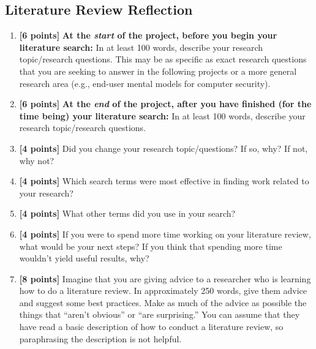 \documentclass{article}
\begin{document}
\subsection{Literature Review Reflection}
\begin{enumerate}
    \item \textbf{[6 points]} \textbf{At the \textit{start} of the project, before you begin your literature search:} In at least 100 words, describe your research topic/research questions. This may be as specific as exact research questions that you are seeking to answer in the following projects or a more general research area (e.g., end-user mental models for computer security).
    \item \textbf{[6 points]} \textbf{At the \textit{end} of the project, after you have finished (for the time being) your literature search:} In at least 100 words, describe your research topic/research questions. 
    \item \textbf{[4 points]} Did you change your research topic/questions? If so, why? If not, why not?
    \item \textbf{[4 points]} Which search terms were most effective in finding work related to your research?
    \item \textbf{[4 points]} What other terms did you use in your search?
    \item \textbf{[4 points]} If you were to spend more time working on your literature review, what would be your next steps? If you think that spending more time wouldn't yield useful results, why?
    \item \textbf{[8 points]} Imagine that you are giving advice to a researcher who is learning how to do a literature review. In approximately 250 words, give them advice and suggest some best practices. Make as much of the advice as possible the things that ``aren't obvious'' or ``are surprising.'' You can assume that they have read a basic description of how to conduct a literature review, so paraphrasing the description is not helpful.
\end{enumerate}
\end{document}
